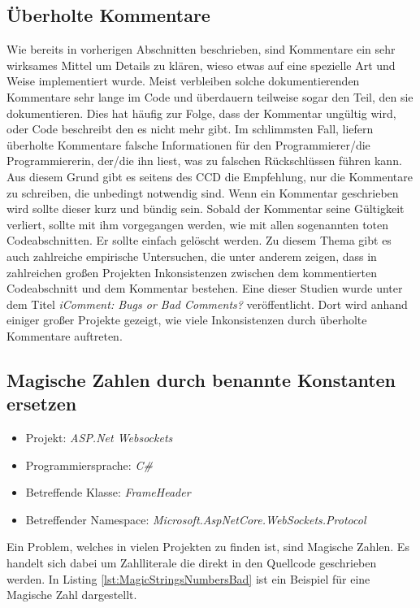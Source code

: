 \subsection{Überholte Kommentare}
\SuperPar Wie bereits in vorherigen Abschnitten beschrieben, sind Kommentare ein sehr wirksames Mittel um Details zu klären, wieso etwas auf eine spezielle Art und Weise implementiert wurde. Meist verbleiben solche dokumentierenden Kommentare sehr lange im Code und überdauern teilweise sogar den Teil, den sie dokumentieren. Dies hat häufig zur Folge, dass der Kommentar ungültig wird, oder Code beschreibt den es nicht mehr gibt. Im schlimmsten Fall, liefern überholte Kommentare falsche Informationen für den Programmierer/die Programmiererin, der/die ihn liest, was zu falschen Rückschlüssen führen kann.  Aus diesem Grund gibt es seitens des CCD die Empfehlung, nur die Kommentare zu schreiben, die unbedingt notwendig sind. Wenn ein Kommentar geschrieben wird sollte dieser kurz und bündig sein. Sobald der Kommentar seine Gültigkeit verliert, sollte mit ihm vorgegangen werden, wie mit allen sogenannten toten Codeabschnitten. Er sollte einfach gelöscht werden. Zu diesem Thema gibt es auch zahlreiche empirische Untersuchen, die unter anderem zeigen, dass in zahlreichen großen Projekten Inkonsistenzen zwischen dem kommentierten Codeabschnitt und dem Kommentar bestehen. Eine dieser Studien wurde unter dem Titel \textit{iComment: Bugs or Bad Comments?} \cite{Lin2007} veröffentlicht. Dort wird anhand einiger großer Projekte gezeigt, wie viele Inkonsistenzen durch überholte Kommentare auftreten.

\subsection{Magische Zahlen durch benannte Konstanten ersetzen}
\begin{itemize}
	\item Projekt: \textit{ASP.Net Websockets}
	\item Programmiersprache: \textit{C\#}
	\item Betreffende Klasse: \textit{FrameHeader}
	\item Betreffender Namespace: \textit{Microsoft.AspNetCore.WebSockets.Protocol}
\end{itemize}

\SuperPar Ein Problem, welches in vielen Projekten zu finden ist, sind Magische Zahlen. Es handelt sich dabei um Zahlliterale die direkt in den Quellcode geschrieben werden. In Listing \ref{lst:MagicStringsNumbersBad} ist ein Beispiel für eine Magische Zahl dargestellt.

